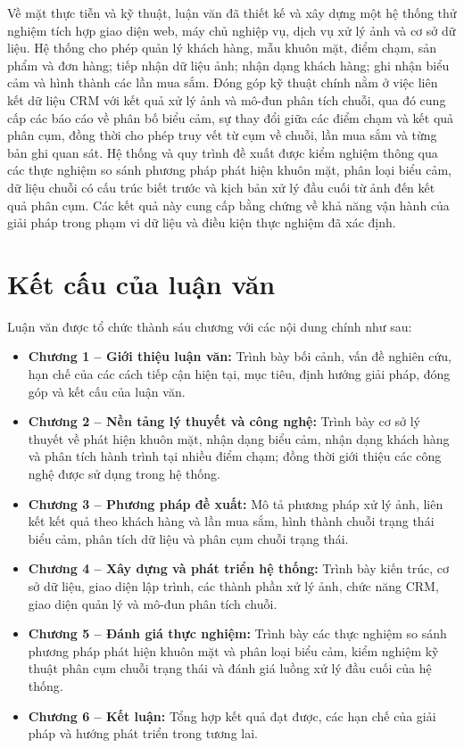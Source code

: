 \documentclass[../LuanVan.tex]{subfiles}
\begin{document}
Về mặt thực tiễn và kỹ thuật, luận văn đã thiết kế và xây dựng một hệ thống thử nghiệm tích hợp giao diện web, máy chủ nghiệp vụ, dịch vụ xử lý ảnh và cơ sở dữ liệu. Hệ thống cho phép quản lý khách hàng, mẫu khuôn mặt, điểm chạm, sản phẩm và đơn hàng; tiếp nhận dữ liệu ảnh; nhận dạng khách hàng; ghi nhận biểu cảm và hình thành các lần mua sắm. Đóng góp kỹ thuật chính nằm ở việc liên kết dữ liệu CRM với kết quả xử lý ảnh và mô-đun phân tích chuỗi, qua đó cung cấp các báo cáo về phân bố biểu cảm, sự thay đổi giữa các điểm chạm và kết quả phân cụm, đồng thời cho phép truy vết từ cụm về chuỗi, lần mua sắm và từng bản ghi quan sát. Hệ thống và quy trình đề xuất được kiểm nghiệm thông qua các thực nghiệm so sánh phương pháp phát hiện khuôn mặt, phân loại biểu cảm, dữ liệu chuỗi có cấu trúc biết trước và kịch bản xử lý đầu cuối từ ảnh đến kết quả phân cụm. Các kết quả này cung cấp bằng chứng về khả năng vận hành của giải pháp trong phạm vi dữ liệu và điều kiện thực nghiệm đã xác định.

\section{Kết cấu của luận văn}
\label{section:1.4}

Luận văn được tổ chức thành sáu chương với các nội dung chính như sau:

\begin{itemize}
    \item \textbf{Chương 1 -- Giới thiệu luận văn:} Trình bày bối cảnh, vấn đề nghiên cứu, hạn chế của các cách tiếp cận hiện tại, mục tiêu, định hướng giải pháp, đóng góp và kết cấu của luận văn.

    \item \textbf{Chương 2 -- Nền tảng lý thuyết và công nghệ:} Trình bày cơ sở lý thuyết về phát hiện khuôn mặt, nhận dạng biểu cảm, nhận dạng khách hàng và phân tích hành trình tại nhiều điểm chạm; đồng thời giới thiệu các công nghệ được sử dụng trong hệ thống.

    \item \textbf{Chương 3 -- Phương pháp đề xuất:} Mô tả phương pháp xử lý ảnh, liên kết kết quả theo khách hàng và lần mua sắm, hình thành chuỗi trạng thái biểu cảm, phân tích dữ liệu và phân cụm chuỗi trạng thái.

    \item \textbf{Chương 4 -- Xây dựng và phát triển hệ thống:} Trình bày kiến trúc, cơ sở dữ liệu, giao diện lập trình, các thành phần xử lý ảnh, chức năng CRM, giao diện quản lý và mô-đun phân tích chuỗi.

    \item \textbf{Chương 5 -- Đánh giá thực nghiệm:} Trình bày các thực nghiệm so sánh phương pháp phát hiện khuôn mặt và phân loại biểu cảm, kiểm nghiệm kỹ thuật phân cụm chuỗi trạng thái và đánh giá luồng xử lý đầu cuối của hệ thống.

    \item \textbf{Chương 6 -- Kết luận:} Tổng hợp kết quả đạt được, các hạn chế của giải pháp và hướng phát triển trong tương lai.
\end{itemize}
\end{document}
